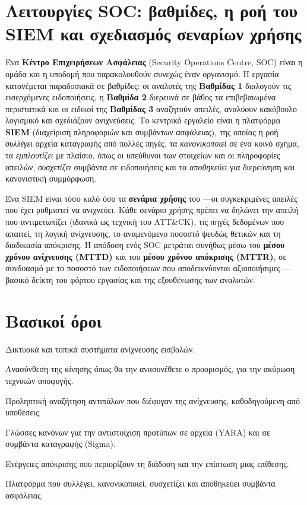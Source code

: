 \section{Λειτουργίες SOC: βαθμίδες, η ροή του SIEM και σχεδιασμός σεναρίων χρήσης}\label{sec:11.7}
Ένα \textbf{Κέντρο Επιχειρήσεων Ασφάλειας} (Security Operations Centre, SOC) είναι η ομάδα και η υποδομή που παρακολουθούν συνεχώς έναν οργανισμό. Η εργασία κατανέμεται παραδοσιακά σε βαθμίδες: οι αναλυτές της \textbf{Βαθμίδας 1} διαλογούν τις εισερχόμενες ειδοποιήσεις, η \textbf{Βαθμίδα 2} διερευνά σε βάθος τα επιβεβαιωμένα περιστατικά και οι ειδικοί της \textbf{Βαθμίδας 3} αναζητούν απειλές, αναλύουν κακόβουλο λογισμικό και σχεδιάζουν ανιχνεύσεις. Το κεντρικό εργαλείο είναι η πλατφόρμα \textbf{SIEM} (διαχείριση πληροφοριών και συμβάντων ασφάλειας), της οποίας η ροή \emph{συλλέγει} αρχεία καταγραφής από πολλές πηγές, τα \emph{κανονικοποιεί} σε ένα κοινό σχήμα, τα \emph{εμπλουτίζει} με πλαίσιο, όπως οι υπεύθυνοι των στοιχείων και οι πληροφορίες απειλών, \emph{συσχετίζει} συμβάντα σε ειδοποιήσεις και τα \emph{αποθηκεύει} για διερεύνηση και κανονιστική συμμόρφωση.

Ένα SIEM είναι τόσο καλό όσο τα \textbf{σενάρια χρήσης} του —οι συγκεκριμένες απειλές που έχει ρυθμιστεί να ανιχνεύει. Κάθε σενάριο χρήσης πρέπει να δηλώνει την απειλή που αντιμετωπίζει (ιδανικά ως τεχνική του ATT\&CK), τις πηγές δεδομένων που απαιτεί, τη λογική ανίχνευσης, το αναμενόμενο ποσοστό ψευδώς θετικών και τη διαδικασία απόκρισης. Η απόδοση ενός SOC μετράται συνήθως μέσω του \textbf{μέσου χρόνου ανίχνευσης (MTTD)} και του \textbf{μέσου χρόνου απόκρισης (MTTR)}, σε συνδυασμό με το ποσοστό των ειδοποιήσεων που αποδεικνύονται αξιοποιήσιμες —βασικό δείκτη του φόρτου εργασίας και της εξουθένωσης των αναλυτών.

\section*{Βασικοί όροι}
\begin{description}[style=nextline,leftmargin=1.2em]
  \item[NIDS / HIDS] Δικτυακά και τοπικά συστήματα ανίχνευσης εισβολών.
  \item[Κανονικοποίηση κίνησης] Ανασύνθεση της κίνησης όπως θα την ανασυνέθετε ο προορισμός, για την ακύρωση τεχνικών αποφυγής.
  \item[Προληπτική αναζήτηση απειλών] Προληπτική αναζήτηση αντιπάλων που διέφυγαν της ανίχνευσης, καθοδηγούμενη από υποθέσεις.
  \item[YARA / Sigma] Γλώσσες κανόνων για την αντιστοίχιση προτύπων σε αρχεία (YARA) και σε συμβάντα καταγραφής (Sigma).
  \item[Περιορισμός] Ενέργειες απόκρισης που περιορίζουν τη διάδοση και την επίπτωση μιας επίθεσης.
  \item[SIEM] Πλατφόρμα που συλλέγει, κανονικοποιεί, συσχετίζει και αποθηκεύει συμβάντα ασφάλειας.
\end{description}

